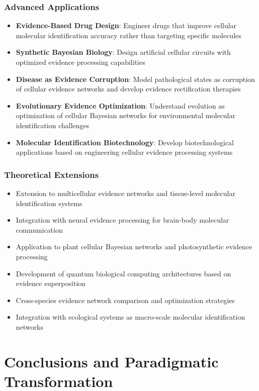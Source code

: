 \documentclass[12pt,a4paper]{article}
\begin{document}
\subsubsection{Advanced Applications}

\begin{itemize}
\item \textbf{Evidence-Based Drug Design}: Engineer drugs that improve cellular molecular identification accuracy rather than targeting specific molecules
\item \textbf{Synthetic Bayesian Biology}: Design artificial cellular circuits with optimized evidence processing capabilities
\item \textbf{Disease as Evidence Corruption}: Model pathological states as corruption of cellular evidence networks and develop evidence rectification therapies
\item \textbf{Evolutionary Evidence Optimization}: Understand evolution as optimization of cellular Bayesian networks for environmental molecular identification challenges
\item \textbf{Molecular Identification Biotechnology}: Develop biotechnological applications based on engineering cellular evidence processing systems
\end{itemize}

\subsubsection{Theoretical Extensions}

\begin{itemize}
\item Extension to multicellular evidence networks and tissue-level molecular identification systems
\item Integration with neural evidence processing for brain-body molecular communication
\item Application to plant cellular Bayesian networks and photosynthetic evidence processing
\item Development of quantum biological computing architectures based on evidence superposition
\item Cross-species evidence network comparison and optimization strategies
\item Integration with ecological systems as macro-scale molecular identification networks
\end{itemize}

\section{Conclusions and Paradigmatic Transformation}
\end{document}
